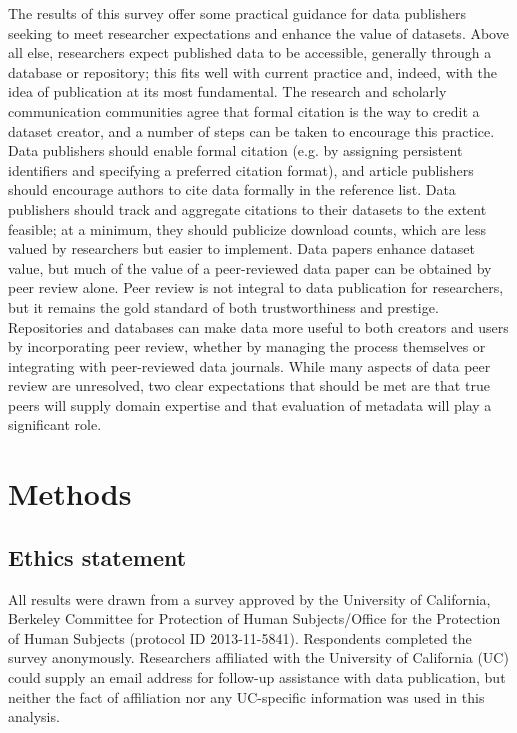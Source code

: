 \documentclass[10pt]{article}
\begin{document}
The results of this survey offer some practical guidance for data publishers seeking to meet researcher expectations and enhance the value of datasets.
Above all else, researchers expect published data to be accessible, generally through a database or repository; this fits well with current practice and, indeed, with the idea of publication at its most fundamental.
The research and scholarly communication communities agree that formal citation is the way to credit a dataset creator, and a number of steps can be taken to encourage this practice.
Data publishers should enable formal citation (e.g. by assigning persistent identifiers and specifying a preferred citation format), and article publishers should encourage authors to cite data formally in the reference list.
Data publishers should track and aggregate citations to their datasets to the extent feasible; at a minimum, they should publicize download counts, which are less valued by researchers but easier to implement.
Data papers enhance dataset value, but much of the value of a peer-reviewed data paper can be obtained by peer review alone.
Peer review is not integral to data publication for researchers, but it remains the gold standard of both trustworthiness and prestige.
Repositories and databases can make data more useful to both creators and users by incorporating peer review, whether by managing the process themselves or integrating with peer-reviewed data journals.
While many aspects of data peer review are unresolved, two clear expectations that should be met are that true peers will supply domain expertise and that evaluation of metadata will play a significant role.


\section*{Methods}

\subsection*{Ethics statement}

All results were drawn from a survey approved by the University of California, Berkeley Committee for Protection of Human Subjects/Office for the Protection of Human Subjects (protocol ID 2013-11-5841).
Respondents completed the survey anonymously.
Researchers affiliated with the University of California (UC) could supply an email address for follow-up assistance with data publication, but neither the fact of affiliation nor any UC-specific information was used in this analysis.
\end{document}
